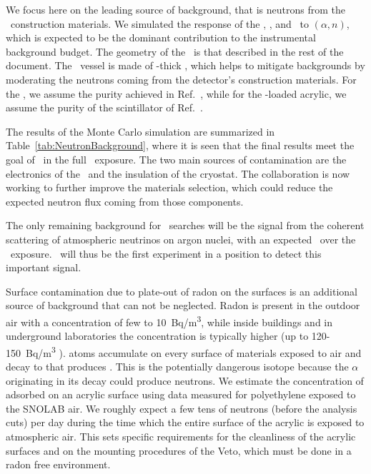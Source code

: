 We focus here on the leading source of background, that is neutrons from the \LArTPC\ construction materials.  We simulated the response of the \LArTPC, \IAB, and \OAB\ to $(\alpha,n)$, which is expected to be the dominant contribution to the instrumental background budget. The geometry of the \LArTPC\ is that described in the rest of the document.  The \LArTPC\ vessel is made of \DSkPMMATPCThickness-thick \PMMA, which helps to mitigate backgrounds by moderating the neutrons coming from the detector's construction materials.  For the \PMMA, we assume the purity achieved in Ref.~\cite{Nantais:2013jp}, while for the -loaded acrylic, we assume the purity of the scintillator of Ref.~\cite{Barabash:2017cu}.

The results of the Monte Carlo simulation are summarized in Table~\ref{tab:NeutronBackground}, where it is seen that the final results meet the goal of \BackgroundFreeRequirement\ in the full \DSkExtendedExposure\ exposure.  The two main sources of contamination are the electronics of the \SiPMs\ and the insulation of the cryostat.  The collaboration is now working to further improve the materials selection, which could reduce the expected neutron flux coming from those components.

The only remaining background for \WIMP\ searches will be the signal from the coherent scattering of atmospheric neutrinos on argon nuclei, with an expected \DSkNuInducedBackgroundExtendedExposureUnit\ over the \DSkExtendedExposure\ exposure.  \DSks\ will thus be the first experiment in a position to detect this important signal. 

Surface contamination due to plate-out of radon on the surfaces is an additional source of background that can not be neglected. Radon is present in the outdoor air with a concentration of few to \SI{10}{Bq/m^3}, while inside buildings and in underground laboratories the concentration is typically higher (up to 120-\SI{150}{Bq/m^3} ).  atoms accumulate on every surface of materials exposed to air and decay to  that produces . This is the potentially dangerous isotope because the $\alpha$ originating in its decay could produce neutrons. We estimate the concentration of  adsorbed on an acrylic surface using data measured for polyethylene exposed to the SNOLAB air.  We roughly expect a few tens of neutrons (before the analysis cuts) per day during the time which the entire surface of the acrylic is exposed to atmospheric air. This sets specific requirements for the cleanliness of the acrylic surfaces and on the mounting procedures of the Veto, which must be done in a radon free environment.
